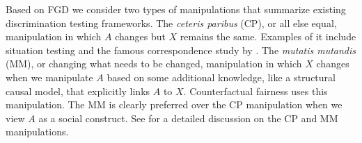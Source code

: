 Based on FGD we consider two types of manipulations that summarize existing discrimination testing frameworks. 
The \textit{ceteris paribus} (CP), or all else equal, manipulation in which $A$ changes but $X$ remains the same. 
Examples of it include situation testing \parencite{Thanh_KnnSituationTesting2011, Zhang_CausalSituationTesting_2016} and the famous correspondence study by \textcite{Bertrand2004_EmilyAndGreg}. 
The \textit{mutatis mutandis} (MM), or changing what needs to be changed, manipulation in which $X$ changes when we manipulate $A$ based on some additional knowledge, like a structural causal model, that explicitly links $A$ to $X$. Counterfactual fairness \parencite{Kusner2017CF} uses this manipulation. The MM is clearly preferred over the CP manipulation when we view $A$ as a social construct.
See \textcite{MutatisMutandis} for a detailed discussion on the CP and MM manipulations.

%
%

